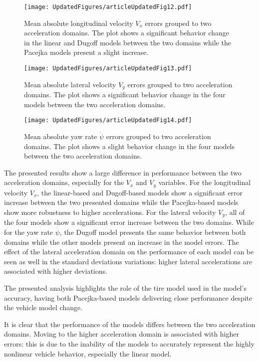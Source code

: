 \documentclass[journal]{IEEEtran}
\begin{document}
\begin{figure}[h]
    \centering
    \texttt{[image: UpdatedFigures/articleUpdatedFig12.pdf]}
    \caption{Mean absolute longitudinal velocity $V_x$ errors grouped to two acceleration domains. The plot shows a significant behavior change in the linear and Dugoff models between the two domains while the Pacejka models present a slight increase.}
    \label{vxCompyAy.fig}
\end{figure}
\begin{figure}[h]
    \centering
    \texttt{[image: UpdatedFigures/articleUpdatedFig13.pdf]}
    \caption{Mean absolute lateral velocity $V_y$ errors grouped to two acceleration domains. The plot shows a significant behavior change in the four models between the two acceleration domains.}
    \label{vyCompyAy.fig}
\end{figure}
\begin{figure}
    \centering
    \texttt{[image: UpdatedFigures/articleUpdatedFig14.pdf]}
    \caption{Mean absolute yaw rate $\dot\psi$ errors grouped to two acceleration domains. The plot shows a slight behavior change in the four models between the two acceleration domains.}
    \label{psiDotCompyAy.fig}
\end{figure}

The presented results show a large difference in performance between the two acceleration domains, especially for the $V_x$ and $V_y$ variables. For the longitudinal velocity $V_x$, the linear-based and Dugoff-based models show a significant error increase between the two presented domains while the Pacejka-based models show more robustness to higher accelerations. For the lateral velocity $V_y$, all of the four models show a significant error increase between the two domains. While for the yaw rate $\dot\psi$, the Dugoff model presents the same behavior between both domains while the other models present an increase in the model errors. The effect of the lateral acceleration domain on the performance of each model can be seen as well in the standard deviations variations: higher lateral accelerations are associated with higher deviations.

The presented analysis highlights the role of the tire model used in the model's accuracy, having both Pacejka-based models delivering close performance despite the vehicle model change.

It is clear that the performance of the models differs between the two acceleration domains. Moving to the higher acceleration domain is associated with higher errors: this is due to the inability of the models to accurately represent the highly nonlinear vehicle behavior, especially the linear model.  
\end{document}
